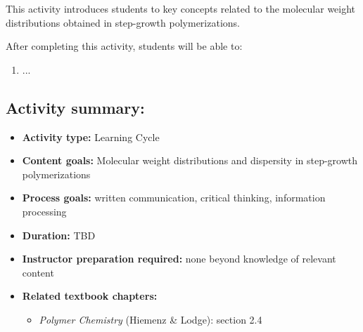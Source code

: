 %
%
%
%

\renewcommand{\figpath}{content/polymchem/stepgrowth/dispersity/figs}

\begin{activity}

\begin{instructornotes}

	This activity introduces students to key concepts related to the molecular weight distributions obtained in step-growth polymerizations.
	
	After completing this activity, students will be able to:
			\begin{enumerate}
				\item ...
			\end{enumerate}
			
	\subsection*{Activity summary:}
	\begin{itemize}
		\item \textbf{Activity type:} Learning Cycle
		\item \textbf{Content goals:} Molecular weight distributions and dispersity in step-growth polymerizations
		\item \textbf{Process goals:} %
			written communication, critical thinking, information processing
		\item \textbf{Duration:} TBD
		\item \textbf{Instructor preparation required:} none beyond knowledge of relevant content
		\item \textbf{Related textbook chapters:}
			\begin{itemize}
				\item \emph{Polymer Chemistry} (Hiemenz \& Lodge): section 2.4
			\end{itemize}
	\end{itemize}


\end{instructornotes}
\end{activity}
